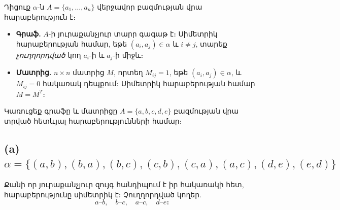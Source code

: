 \documentclass[12pt, a4paper]{article}
\begin{document}
\begin{theorybox}
Դիցուք $\alpha$-ն $A = \{a_1,\dots,a_n\}$ վերջավոր բազմության վրա հարաբերություն է։
\begin{itemize}[nosep]
  \item \textbf{Գրաֆ.} $A$-ի յուրաքանչյուր տարր գագաթ է։ Սիմետրիկ հարաբերության համար, եթե $(a_i, a_j) \in \alpha$ և $i \ne j$, տարեք \emph{չուղղորդված} կող $a_i$-ի և $a_j$-ի միջև։
  \item \textbf{Մատրից.} $n \times n$ մատրից $M$, որտեղ $M_{ij} = 1$, եթե $(a_i, a_j) \in \alpha$, և $M_{ij} = 0$ հակառակ դեպքում։ Սիմետրիկ հարաբերության համար $M = M^T$։
\end{itemize}
\end{theorybox}

\begin{problembox}
Կառուցեք գրաֆը և մատրիցը $A = \{a, b, c, d, e\}$ բազմության վրա տրված հետևյալ հարաբերությունների համար։
\end{problembox}


\subsection*{(a)\; $\alpha = \{(a,b),(b,a),(b,c),(c,b),(c,a),(a,c),(d,e),(e,d)\}$}

Քանի որ յուրաքանչյուր զույգ հանդիպում է իր հակառակի հետ, հարաբերությունը սիմետրիկ է։ Չուղղորդված կողեր.
\[
  \boxed{a\text{--}b,\quad b\text{--}c,\quad a\text{--}c,\quad d\text{--}e։}
\]
\end{document}
